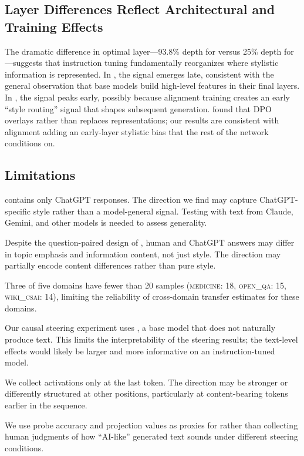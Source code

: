 \subsection{Layer Differences Reflect Architectural and Training Effects}

The dramatic difference in optimal layer---93.8\% depth for \pythia versus 25\% depth for \qwen---suggests that instruction tuning fundamentally reorganizes where stylistic information is represented.
In \pythia, the \aistyle signal emerges late, consistent with the general observation that base models build high-level features in their final layers.
In \qwen, the signal peaks early, possibly because alignment training creates an early ``style routing'' signal that shapes subsequent generation.
\citet{lee2024mechanistic} found that DPO overlays rather than replaces representations; our results are consistent with alignment adding an early-layer stylistic bias that the rest of the network conditions on.

\subsection{Limitations}

\hcthree contains only ChatGPT responses.
The direction we find may capture ChatGPT-specific style rather than a model-general \aistyle signal.
Testing with text from Claude, Gemini, and other models is needed to assess generality.

Despite the question-paired design of \hcthree, human and ChatGPT answers may differ in topic emphasis and information content, not just style.
The direction may partially encode content differences rather than pure style.

Three of five domains have fewer than 20 samples (\textsc{medicine}: 18, \textsc{open\_qa}: 15, \textsc{wiki\_csai}: 14), limiting the reliability of cross-domain transfer estimates for these domains.

Our causal steering experiment uses \pythia, a base model that does not naturally produce \aistyle text.
This limits the interpretability of the steering results; the text-level effects would likely be larger and more informative on an instruction-tuned model.

We collect activations only at the last token.
The \aistyle direction may be stronger or differently structured at other positions, particularly at content-bearing tokens earlier in the sequence.

We use probe accuracy and projection values as proxies for \aistyle rather than collecting human judgments of how ``AI-like'' generated text sounds under different steering conditions.

